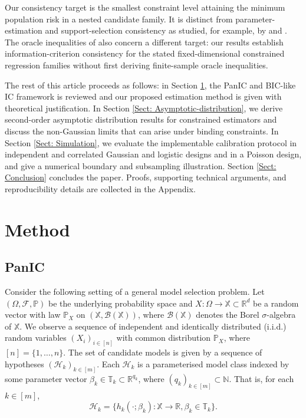 \documentclass[12pt]{article}
\theoremstyle{remark}
\theoremstyle{plain}
\begin{document}
Our consistency target is the smallest constraint level attaining the minimum population risk in a nested candidate family. It is distinct from parameter-estimation and support-selection consistency as studied, for example, by \citet{fan_2001} and \citet{zhao_model_2006}. The oracle inequalities of \citet{massart_2011_lasso_l1} also concern a different target: our results establish information-criterion consistency for the stated fixed-dimensional constrained regression families without first deriving finite-sample oracle inequalities.

The rest of this article proceeds as follows: in Section \ref{Sect: Method}, the PanIC and BIC-like IC framework is reviewed and our proposed estimation method is given with theoretical justification. In Section \ref{Sect: Asymptotic-distribution}, we derive second-order asymptotic distribution results for constrained estimators and discuss the non-Gaussian limits that can arise under binding constraints. In Section \ref{Sect: Simulation}, we evaluate the implementable calibration protocol in independent and correlated Gaussian and logistic designs and in a Poisson design, and give a numerical boundary and subsampling illustration. Section \ref{Sect: Conclusion} concludes the paper. Proofs, supporting technical arguments, and reproducibility details are collected in the Appendix.

\section{Method} \label{Sect: Method}
\subsection{PanIC}\label{Sect: PanIC}
Consider the following setting of a general model selection problem. Let $(\Omega, \mathcal{F}, \mathbb{P})$ be the underlying probability space and $X: \Omega \to \mathbb{X} \subset \mathbb{R}^d$ be a random vector with law $\mathbb{P}_X$ on $(\mathbb{X}, \mathcal{B}(\mathbb{X}))$, where $\mathcal{B}(\mathbb{X})$ denotes the Borel $\sigma$-algebra of $\mathbb{X}$. We observe a sequence of independent and identically distributed (i.i.d.) random variables $(X_i)_{i \in \left[n\right]}$ with common distribution $\mathbb{P}_X$, where $\left[n\right] = \{1, \hdots, n\}$. The set of candidate models is given by a sequence of hypotheses $(\mathcal{H}_k)_{k \in \left[m\right]}$. Each $\mathcal{H}_k$ is a parameterised model class indexed by some parameter vector $\beta_k \in \mathbb{T}_k \subset \mathbb{R}^{q_k}$, where $(q_k)_{k \in \left[m\right]} \subset \mathbb{N}$. That is, for each $k \in \left[m\right]$,
\[\mathcal{H}_k = \{h_k(\cdot; \beta_k): \mathbb{X} \to \mathbb{R}, \beta_k \in \mathbb{T}_k\}.\]
\end{document}
